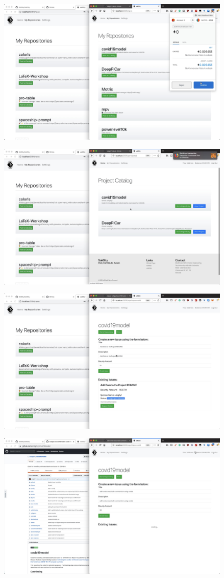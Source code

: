 \documentclass[12pt]{article}
\renewcommand{\_}{\kern-1.5pt\textunderscore\kern-1.5pt}
\begin{document}
\includegraphics[height=7cm]{graphs/24. alice_post_to_catalog_2}

\includegraphics[height=7cm]{graphs/25. added_project_catalog}

\includegraphics[height=7cm]{graphs/26. alice_create_issue1}

\includegraphics[height=7cm]{graphs/27. alice_create_issue2}
\end{document}
